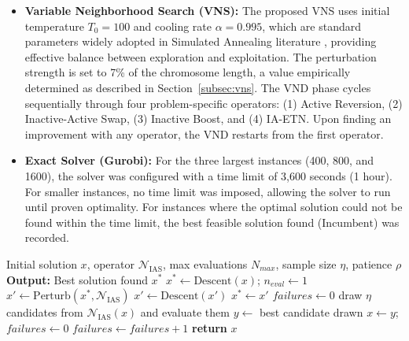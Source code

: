 \documentclass[preprint,12pt,authoryear]{elsarticle}
\begin{document}
\begin{itemize}
    \item \textbf{Variable Neighborhood Search (VNS):} The proposed VNS uses initial temperature $T_0 = 100$ and cooling rate $\alpha = 0.995$, which are standard parameters widely
    adopted in Simulated Annealing literature \citep{kirkpatrick1983optimization}, providing effective balance between exploration and exploitation. The perturbation strength is set to 7\% of the
    chromosome length, a value empirically determined as described in Section~\ref{subsec:vns}. The VND phase cycles sequentially through four problem-specific operators: (1) Active Reversion,
    (2) Inactive-Active Swap, (3) Inactive Boost, and (4) IA-ETN. Upon finding an improvement with any operator, the VND restarts from the first operator.

    \item \textbf{Exact Solver (Gurobi):} For the three largest instances (400, 800, and 1600), the solver was configured with a time limit of 3,600 seconds (1 hour).
    For smaller instances, no time limit was imposed, allowing the solver to run until proven optimality. For instances where the optimal solution could not be found within
    the time limit, the best feasible solution found ($\text{Incumbent}$) was recorded.
\end{itemize}

\begin{algorithm}
    \caption{Iterated Local Search baseline}
    \label{algoILS}
    \begin{algorithmic}[1]
    \Require Initial solution $x$, operator $\mathcal{N}_{\text{IAS}}$, max evaluations $N_{max}$, sample size $\eta$, patience $\rho$
    \State \textbf{Output:} Best solution found $x^{*}$
    \State $x^{*} \leftarrow \text{Descent}(x)$; \quad $n_{eval} \leftarrow 1$
        \State $x' \leftarrow \text{Perturb}(x^{*}, \mathcal{N}_{\text{IAS}})$ 
        \State $x' \leftarrow \text{Descent}(x')$
            \State $x^{*} \leftarrow x'$
        \EndIf
    \EndWhile
    \Statex
        \State $\textit{failures} \leftarrow 0$
            \State draw $\eta$ candidates from $\mathcal{N}_{\text{IAS}}(x)$ and evaluate them
            \State $y \leftarrow$ best candidate drawn
                \State $x \leftarrow y$; \quad $\textit{failures} \leftarrow 0$
            \Else
                \State $\textit{failures} \leftarrow \textit{failures} + 1$
            \EndIf
        \EndWhile
        \State \textbf{return} $x$
    \EndFunction
    \end{algorithmic}
\end{algorithm}
\end{document}
